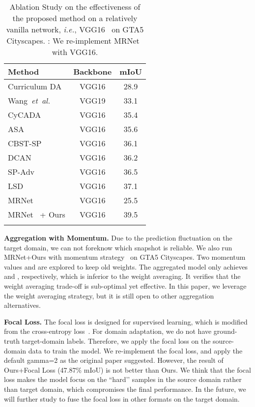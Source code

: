 \documentclass[journal]{IEEEtran}
\def\ie{\emph{i.e.}}
\def\etal{\emph{et~al.}}
\begin{document}
\setlength{\tabcolsep}{20pt}
\begin{table}[tb]
	\caption{
		Ablation Study on the effectiveness of the proposed method on a relatively vanilla network, \ie, VGG16~\cite{simonyan2014very} on GTA5  Cityscapes. : We re-implement MRNet~\cite{zheng2019unsupervised} with VGG16.
	}
		\label{table:vgg}\vspace{-.1in}
\footnotesize
	\centering
	\begin{tabular}{l|c|c}
		\shline
		Method & Backbone & mIoU \\
		\hline
		Curriculum DA~\cite{zhang2017curriculum} & VGG16 & 28.9 \\
		Wang~\etal~\cite{wang2019weakly}& VGG19 & 33.1 \\
		CyCADA~\cite{hoffman2018cycada} & VGG16 & 35.4 \\
		ASA~\cite{zhou2020affinity} & VGG16 &35.6 \\ 
		CBST-SP~\cite{zou2018unsupervised} & VGG16 & 36.1 \\
		DCAN~\cite{wu2018dcan} & VGG16 & 36.2 \\
		SP-Adv~\cite{SHAN2020125} & VGG16 & 36.5 \\
		LSD~\cite{sankaranarayanan2018learning}
		& VGG16 & 37.1 \\
		\hline
		MRNet~\cite{zheng2019unsupervised} & VGG16 & 25.5 \\
		MRNet~\cite{zheng2019unsupervised} + Ours & VGG16 & 39.5 \\
		\shline
	\end{tabular}
\end{table}

\noindent\textbf{Aggregation with Momentum.} Due to the prediction fluctuation on the target domain, we can not foreknow which snapshot is reliable. We also run MRNet+Ours with momentum strategy~\cite{sutskever2013importance} on GTA5  Cityscapes. Two momentum values  and  are explored to keep old weights. The aggregated model only achieves  and , respectively, which is inferior to the weight averaging. It verifies that the weight averaging trade-off is sub-optimal yet effective. In this paper, we leverage the weight averaging strategy, but it is still open to other aggregation alternatives.

\noindent\textbf{Focal Loss.} The focal loss is designed for supervised learning, which is modified from the cross-entropy loss~\cite{lin2017focal}. For domain adaptation, we do not have ground-truth target-domain labels. Therefore, we apply the focal loss on the source-domain data to train the model. We re-implement the focal loss, and apply the default gamma=2 as the original paper suggested. However, the result of Ours+Focal Loss (47.87\% mIoU) is not better than Ours. We think that the focal loss makes the model focus on the ``hard’’ samples in the source domain rather than target domain, which compromises the final performance. In the future, we will further study to fuse the focal loss in other formats on the target domain. 
\end{document}
